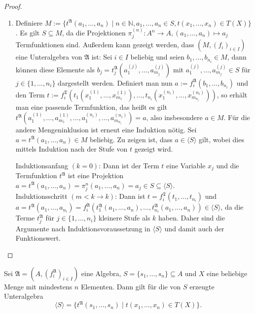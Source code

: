 \begin{proof}
\begin{enumerate}
        \item Definiere $M:=\{t^\mathfrak{A}(a_1,\ldots,a_n) \mid n \in \mathbb{N}, a_1,\ldots,a_n\in S, t(x_1,\ldots,x_n) \in T(X) \}$. Es gilt $S\subseteq M$, da die Projektionen $\pi_j^{(n)}:A^n\to A, (a_1,\ldots,a_n)\mapsto a_j$ Termfunktionen sind.
        Außerdem kann gezeigt werden, dass $(M,(f_i)_{i\in I})$ eine Unteralgebra von $\mathfrak{A}$ ist: Sei $i\in I$ beliebig und seien $b_1,\ldots,b_{n_i}\in M$, dann können diese Elemente als $b_j=t_j^\mathfrak{A}(a_1^{(j)},\ldots,a_{m_j}^{(j)})$
        mit $a_1^{(j)},\ldots,a_{m_j}^{(j)}\in S$ für $j\in \{1,\ldots,n_i\}$ dargestellt werden. Definiert man nun $a:=f^\mathfrak{A}_i(b_1,\ldots,b_{n_i})$
        und den Term $t:=f_i^\mathfrak{T}(t_1(x_1^{(1)},\ldots,x_{m_1}^{(1)}),\ldots,t_{n_i}(x_1^{(n_i)},\ldots,x_{m_{n_i}}^{(n_i)}))$,
        so erhält man eine passende Termfunktion, das heißt es gilt $t^\mathfrak{A}(a_1^{(1)},\ldots,a_{m_1}^{(1)},\ldots,a_1^{(n_i)},\ldots,a_{m_{n_i}}^{(n_i)})=a$,
        also insbesondere $a\in M$. Für die andere Mengeninklusion ist erneut eine Induktion nötig.
        Sei $a=t^\mathfrak{A}(a_1,\ldots,a_n)\in M$ beliebig. Zu zeigen ist, dass $a\in \langle S\rangle$ gilt,
        wobei dies mittels Induktion nach der Stufe von $t$ gezeigt wird.

        Induktionsanfang $(k=0)$: Dann ist der Term $t$ eine Variable $x_j$ und die Termfunktion
        $t^\mathfrak{A}$ ist eine Projektion $a=t^\mathfrak{A}(a_1,\ldots,a_n)=\pi_j^n(a_1,\ldots,a_n)=a_j\in S\subseteq \langle S\rangle$.\\
        Induktionsschritt $(m<k\to k)$: Dann ist $t=f^\mathfrak{T}_i(t_1,\ldots,t_{n_i})$ und
        $a=t^\mathfrak{A}(a_1,\ldots,a_{n_i})=f^\mathfrak{A}_i(t^\mathfrak{A}_1(a_1,\ldots,a_n),\ldots,t^\mathfrak{A}_{n_i}(a_1,\ldots,a_n))\in\langle S\rangle$,
        da die Terme $t^\mathfrak{A}_j$ für $j\in\{1,\ldots,n_i\}$ kleinere Stufe als $k$ haben. Daher
        sind die Argumente nach Induktionsvoraussetzung in $\langle S\rangle$ und damit auch
        der Funktionswert.
    \end{enumerate}
\end{proof}

\begin{corollary}
    Sei $\mathfrak{A}=(A,(f^\mathfrak{A}_i)_{i\in I})$ eine Algebra, $S=\{s_1,\ldots,s_n\}\subseteq A$ und $X$ eine beliebige Menge mit mindestens $n$ Elementen.
    Dann gilt für die von $S$ erzeugte Unteralgebra
    $$ \langle S\rangle=\{t^\mathfrak{A}(s_1,\ldots,s_n)\mid t(x_1,\ldots,x_n)\in T(X)\}. $$
\end{corollary}

